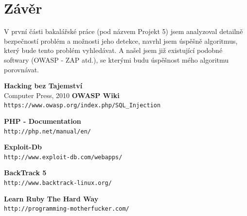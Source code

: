 \documentclass[12pt, a4paper]{report}
\begin{document}

\chapter{Závěr}
V první části bakalářské práce (pod názvem Projekt 5) jsem analyzoval detailně bezpečností problém a možnosti jeho detekce, navrhl jsem úspěšně algoritmus, který bude tento problém vyhledávat. A našel jsem již existující podobné softwary (OWASP - ZAP  atd.), se kterými budu úspěšnost mého algoritmu porovnávat.

\begin{thebibliography}{9}
               {\bf Hacking bez Tajemství} \\
           Computer Press, 2010
	{\bf OWASP Wiki} \\
	\texttt{https://www.owasp.org/index.php/SQL\_Injection}

	{\bf PHP - Documentation}\\
	\texttt{http://php.net/manual/en/}

	{\bf Exploit-Db}\\
	\texttt{http://www.exploit-db.com/webapps/}

 {\bf BackTrack 5}\\
	\texttt{http://www.backtrack-linux.org/}

 {\bf Learn Ruby The Hard Way}\\
	\texttt{http://programming-motherfucker.com/}

\end{thebibliography}
\end{document}
